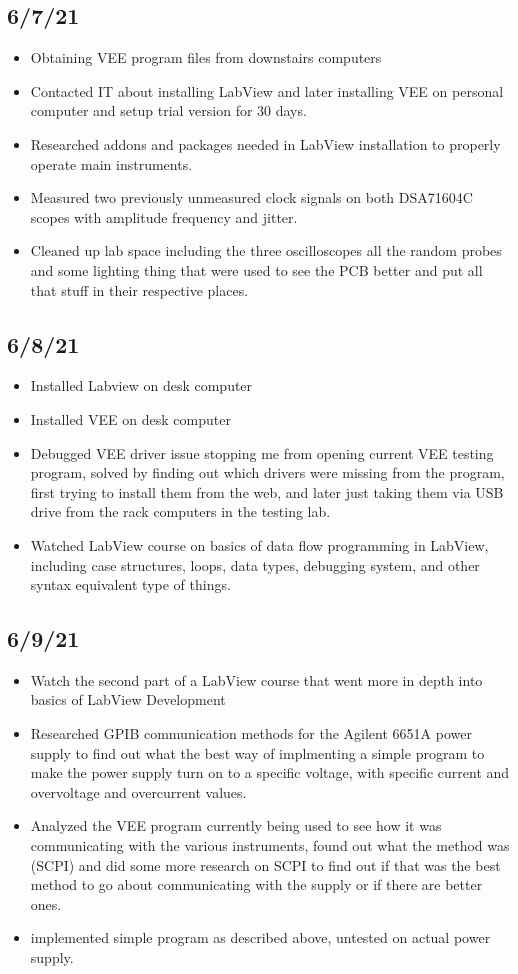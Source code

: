 \documentclass{article}
\begin{document}
\subsection*{6/7/21}
\begin{itemize}
    \item Obtaining VEE program files from downstairs computers
    \item Contacted IT about installing LabView and later installing VEE on personal computer and setup trial version for 30 days.
    \item Researched addons and packages needed in LabView installation to properly operate main instruments.
    \item Measured two previously unmeasured clock signals on both DSA71604C scopes with amplitude frequency and jitter.
    \item Cleaned up lab space including the three oscilloscopes all the random probes and some lighting thing that were used to see the PCB better and put all that stuff in their respective places.
\end{itemize}
\subsection*{6/8/21}
\begin{itemize}
    \item Installed Labview on desk computer
    \item Installed VEE on desk computer
    \item Debugged VEE driver issue stopping me from opening current VEE testing program, solved by finding out which drivers were missing from the program, first trying to install them from the web, and later just taking them via USB drive from the rack computers in the testing lab.
    \item Watched LabView course on basics of data flow programming in LabView, including case structures, loops, data types, debugging system, and other syntax equivalent type of things.
\end{itemize}
\subsection*{6/9/21}
\begin{itemize}
    \item Watch the second part of a LabView course that went more in depth into basics of LabView Development
    \item Researched GPIB communication methods for the Agilent 6651A power supply to find out what the best way of implmenting a simple program to make the power supply turn on to a specific voltage, with specific current and overvoltage and overcurrent values.
    \item Analyzed the VEE program currently being used to see how it was communicating with the various instruments, found out what the method was (SCPI) and did some more research on SCPI to find out if that was the best method to go about communicating with the supply or if there are better ones.
    \item implemented simple program as described above, untested on actual power supply.
\end{itemize}
\end{document}
